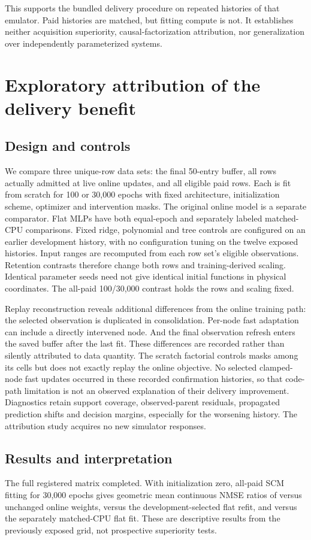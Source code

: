 This supports the bundled delivery procedure on repeated histories of that
emulator. Paid histories are matched, but fitting compute is not. It establishes
neither acquisition superiority, causal-factorization attribution, nor
generalization over independently parameterized systems.

\section{Exploratory attribution of the delivery benefit}
\label{sec:protocol}
\subsection{Design and controls}
We compare three unique-row data sets: the final 50-entry buffer, all rows
actually admitted at live online updates, and all eligible paid rows. Each is
fit from scratch for 100 or 30,000 epochs with fixed architecture, initialization
scheme, optimizer and intervention masks. The original online model is a
separate comparator. Flat MLPs have both equal-epoch and separately labeled
matched-CPU comparisons. Fixed ridge, polynomial and tree controls are
configured on an earlier development history, with no configuration tuning on
the twelve exposed histories.
Input ranges are recomputed from each row set's eligible observations. Retention
contrasts therefore change both rows and training-derived scaling. Identical
parameter seeds need not give identical initial functions in physical coordinates.
The all-paid 100/30,000 contrast holds the rows and scaling fixed.

Replay reconstruction reveals additional differences from the online training
path: the selected observation is duplicated in consolidation. Per-node fast
adaptation can include a directly intervened node. And the final observation
refresh enters the saved buffer after the last fit. These differences are
recorded rather than silently attributed to data quantity. The scratch factorial
controls masks among its cells but does not exactly replay the online objective.
No selected clamped-node fast updates occurred in these recorded confirmation
histories, so that code-path limitation is not an observed explanation of their
delivery improvement.
Diagnostics retain support coverage, observed-parent residuals, propagated
prediction shifts and decision margins, especially for the worsening history.
The attribution study acquires no new simulator responses.

\subsection{Results and interpretation}
The full registered matrix completed. With initialization zero, all-paid SCM fitting for 30,000 epochs gives
geometric mean continuous NMSE ratios of \AOnlineRatio{} versus unchanged
online weights, \AFlatRatio{} versus the development-selected flat refit, and
\AMatchedRatio{} versus the separately matched-CPU flat fit. These are
descriptive results from the previously exposed grid, not prospective
superiority tests.

